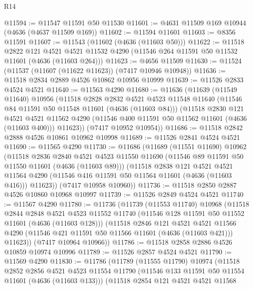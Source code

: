 \begin{lexlean}{R14}
\begin{coremodule}
@11594 := @11547 @11591 @50 @11530
@11601 := @4631 @11509 @169 @10944 (@4636 (@4637 @11509 @169))
@11602 := @11594 @11601
@11603 := @8356 @11591
@11607 := @11543 (@11602 (@4636 (@11603 @50)))
@11622 := @11518
    @2822
    @121
    @4521
    @4521
    @11532
    @4290
    (@11546 @264 @11591 @50 @11532 @11601 (@4636 (@11603 @264)))
@11623 := @4656 @11509
@11630 := @11524 (@11537 (@11607 (@11622 @11623)) (@7417 @10946 @10948))
@11636 := @11518 @2834 @2889 @4526 @10862 @10956 @10999
@11639 := @11526 @2833 @4524 @4521
@11640 := @11563 @4290
@11680 := @11636
    (@11639
      (@11549 @11640)
      @10956
      (@11518
        @2828
        @2832
        @4521
        @4523
        @11548
        @11640
        (@11546 @84 @11591 @50 @11548 @11601 (@4636 (@11603 @84)))
        (@11518
          @2830
          @121
          @4521
          @4521
          @11562
          @4290
          (@11546 @400 @11591 @50 @11562 @11601 (@4636 (@11603 @400)))
          @11623))
      (@7417 @10952 @10954))
@11686 := @11518 @2842 @2888 @4526 @10861 @10962 @10998
@11689 := @11526 @2841 @4524 @4521
@11690 := @11565 @4290
@11730 := @11686
    (@11689
      (@11551 @11690)
      @10962
      (@11518
        @2836
        @2840
        @4521
        @4523
        @11550
        @11690
        (@11546 @89 @11591 @50 @11550 @11601 (@4636 (@11603 @89)))
        (@11518
          @2838
          @121
          @4521
          @4521
          @11564
          @4290
          (@11546 @416 @11591 @50 @11564 @11601 (@4636 (@11603 @416)))
          @11623))
      (@7417 @10958 @10960))
@11736 := @11518 @2850 @2887 @4526 @10860 @10968 @10997
@11739 := @11526 @2849 @4524 @4521
@11740 := @11567 @4290
@11780 := @11736
    (@11739
      (@11553 @11740)
      @10968
      (@11518
        @2844
        @2848
        @4521
        @4523
        @11552
        @11740
        (@11546 @128 @11591 @50 @11552 @11601 (@4636 (@11603 @128)))
        (@11518
          @2846
          @121
          @4521
          @4521
          @11566
          @4290
          (@11546 @421 @11591 @50 @11566 @11601 (@4636 (@11603 @421)))
          @11623))
      (@7417 @10964 @10966))
@11786 := @11518 @2858 @2886 @4526 @10859 @10974 @10996
@11789 := @11526 @2857 @4524 @4521
@11790 := @11569 @4290
@11830 := @11786
    (@11789
      (@11555 @11790)
      @10974
      (@11518
        @2852
        @2856
        @4521
        @4523
        @11554
        @11790
        (@11546 @133 @11591 @50 @11554 @11601 (@4636 (@11603 @133)))
        (@11518
          @2854
          @121
          @4521
          @4521
          @11568

\end{coremodule}
\end{lexlean}
